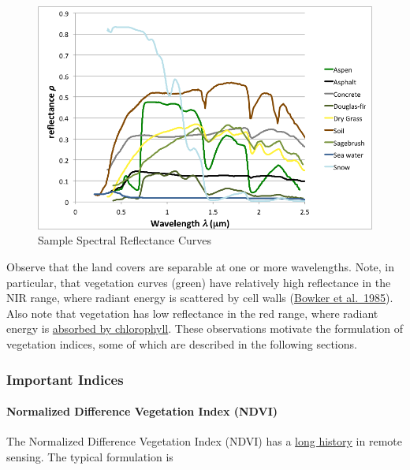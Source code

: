 \documentclass[
]{article}
\begin{document}
\begin{figure}

{\centering \includegraphics[width=0.95\linewidth]{./im/im_04_01} 

}

\caption{Sample Spectral Reflectance Curves}\label{fig:specindices}
\end{figure}

Observe that the land covers are separable at one or more wavelengths. Note, in particular, that vegetation curves (green) have relatively high reflectance in the NIR range, where radiant energy is scattered by cell walls (\href{http://ntrs.nasa.gov/archive/nasa/casi.ntrs.nasa.gov/19850022138.pdf}{Bowker et al.~1985}). Also note that vegetation has low reflectance in the red range, where radiant energy is \href{https://en.wikipedia.org/wiki/Chlorophyll\#/media/File:Chlorophyll_ab_spectra-en.svg}{absorbed by chlorophyll}. These observations motivate the formulation of vegetation indices, some of which are described in the following sections.

\hypertarget{important-indices}{%
\subsubsection{Important Indices}\label{important-indices}}

\hypertarget{normalized-difference-vegetation-index-ndvi}{%
\paragraph{Normalized Difference Vegetation Index (NDVI)}\label{normalized-difference-vegetation-index-ndvi}}

The Normalized Difference Vegetation Index (NDVI) has a \href{https://en.wikipedia.org/wiki/Normalized_Difference_Vegetation_Index}{long history} in remote sensing. The typical formulation is
\end{document}
